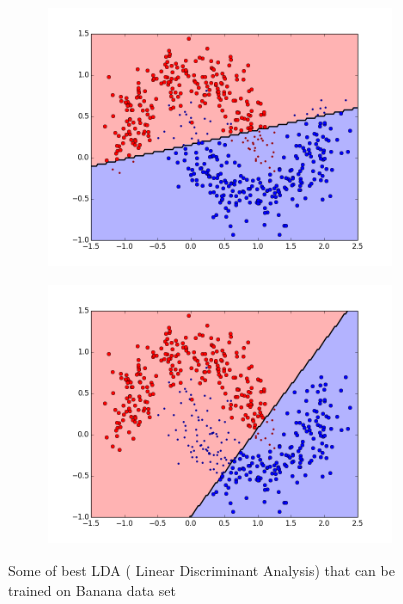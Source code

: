 \begin{figure}[t!]
\medskip
\begin{subfigure}{0.48\textwidth}
\includegraphics[width=\linewidth]{figs/Banana/147All-Classifiers}
\caption{} \label{fig:Banana_all_single_e}
\end{subfigure}\hspace*{\fill}
\begin{subfigure}{0.48\textwidth}
\includegraphics[width=\linewidth]{figs/Banana/160All-Classifiers}
\caption{} \label{fig:Banana_all_single_f}
\end{subfigure}

\caption{Some of best LDA ( Linear Discriminant Analysis) that can be trained on Banana data set} \label{fig:Banana_all_single}
\end{figure}

